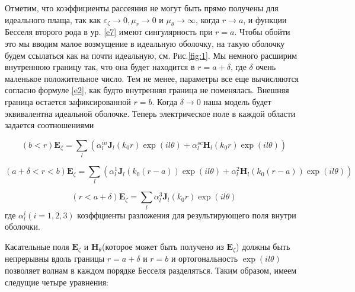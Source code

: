\documentclass[a4paper, 12pt]{article}
\begin{document}
Отметим, что коэффициенты рассеяния не могут быть прямо получены для идеального плаща, так как $\varepsilon_\zeta \to 0,
\mu_r \to 0$ и $\mu_\theta \to \infty$, когда $r \to a$, и функции Бесселя второго рода в ур. \eqref{e7} имеют 
сингулярность при $r = a$. Чтобы обойти это мы вводим малое возмущение в идеальную оболочку, на такую оболочку будем
ссылаться как на почти идеальную, см. Рис.\ref{fig:1}.  Мы немного расширим внутреннюю границу так, что она будет
находится в $r = a + \delta$, где $\delta$ очень маленькое положительное число. Тем не менее, параметры все еще
вычисляются согласно формуле \eqref{e2}, как будто внутренняя граница не поменялась. Внешняя граница остается
зафиксированной $r = b$. Когда $\delta \to 0$ наша модель будет эквивалентна идеальной оболочке. Теперь электрическое
поле в каждой области задается соотношениями

\begin{equation*}
	(b<r)\mathbf{E}_\zeta = \sum\limits_l (\alpha_l^{in} \mathbf{J}_l(k_0 r)\exp(il\theta) +
								\alpha_l^{sc} \mathbf{H}_l(k_0 r)\exp(il\theta))
\end{equation*}
 
\begin{equation}
	(a+\delta<r<b)\mathbf{E}_\zeta = \sum\limits_l (\alpha_l^{1} \mathbf{J}_l(k_0 (r-a))\exp(il\theta) +
								\alpha_l^{2} \mathbf{H}_l(k_0 (r-a))\exp(il\theta))
\end{equation}

\begin{equation*}
	(r<a+\delta)\mathbf{E}_\zeta = \sum\limits_l \alpha_l^{3} \mathbf{J}_l(k_0 r)\exp(il\theta)
\end{equation*}
где $\alpha_l^i(i=1,2,3)$ коэффциенты разложения для результирующего поля внутри оболочки.

Касательные поля $\mathbf{E}_\zeta$ и $\mathbf{H}_\theta$(которое может быть получено из $\mathbf{E}_\zeta$)
должны быть непрерывны вдоль границы $r=a+\delta$ и $r=b$ и ортогональность $\exp(il\theta)$ позволяет волнам
в каждом порядке Бесселя разделяться. Таким образом, имеем следущие четыре уравнения:
\end{document}
